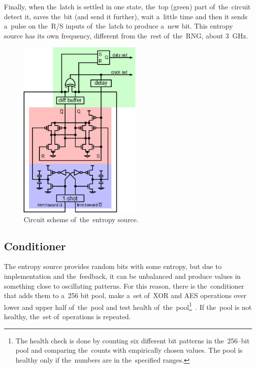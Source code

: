 \par{
Finally, when the~latch is settled in one state, the~top (green) part 
of~the~circuit detect it, saves the~bit (and send it further), wait 
a~little time and then it sends a~pulse on the~R/S inputs of~the~latch 
to produce a~new bit. This entropy source has its own frequency, different 
from the~rest of~the~RNG, about 3~GHz.
}
\begin{figure}[h!]
  \centering
 \includegraphics[width=6cm,keepaspectratio]{fig/entropy-source-circuit} %
\caption{Circuit scheme of~the~entropy source.~\cite{UnderstandingRdRandElectronic}}
\label{fig:ES-circuit}
\end{figure}

\subsection{Conditioner}
\par{
The entropy source provides random bits with some entropy, 
but due to implementation and the~feedback, it can be unbalanced 
and produce values in something close to oscillating patterns. 
For this reason, there is the~conditioner that adds them to a~256 bit pool, 
make a~set of~XOR and AES operations over lower and upper half of~the~pool 
and test health of~the~pool\footnote{The health check is done by counting six 
different bit patterns in the~256--bit pool and comparing the~counts 
with empirically chosen values. The pool is healthy only if the~numbers are 
in the~specified ranges.
}~\cite{AnalysisOfDRNG,UnderstandingRdRandElectronic}. 
If the~pool is not healthy, the~set of~operations is repeated. 
}
